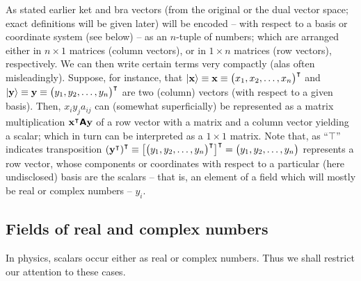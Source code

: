 As stated earlier ket and bra vectors (from the original or the dual vector space; exact definitions will be given later)
will be encoded -- with respect to a basis or coordinate system (see below) -- as an $n$-tuple of numbers;
which are arranged either in $n \times 1$ matrices (column vectors),
or in $1 \times n$ matrices (row vectors), respectively.
We can then write certain terms very compactly (alas often misleadingly).
Suppose, for instance, that
$\vert {\bf x} \rangle \equiv {\bf x}\equiv \begin{pmatrix}x_1, x_2,\ldots ,x_n\end{pmatrix}^\intercal $
and
$\vert {\bf y} \rangle \equiv {\bf y}\equiv \begin{pmatrix}y_1, y_2,\ldots ,y_n\end{pmatrix}^\intercal $
are two (column) vectors (with respect to a given basis).
Then, $x_iy_j a_{ij}$ can (somewhat superficially) be represented as a matrix multiplication ${\bf x}^\intercal  \textsf{\textbf{A}} {\bf y}$ of
a row vector with a matrix and a column vector  yielding a scalar; which in turn can be interpreted as a $1 \times 1$ matrix.
Note that, as ``$\intercal$'' indicates transposition
$\left({\bf y}^\intercal \right)^\intercal \equiv \left[ \begin{pmatrix}
y_1,
y_2,
\ldots ,
y_n
\end{pmatrix}^\intercal \right]^\intercal
=
\begin{pmatrix}
y_1,
y_2,
\ldots ,
y_n
\end{pmatrix}
$
represents a row vector, whose components or coordinates with respect to a particular (here undisclosed) basis are the scalars -- that is, an element of a field which will mostly be real or complex numbers -- $y_i$.

\subsection{Fields of real and complex numbers}
\label{2017-m-ch-fdvs-fields}

In physics, scalars occur either as real or complex numbers.
Thus we shall restrict our attention to these cases.

